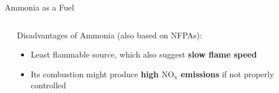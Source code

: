 \begin{frame}{Ammonia as a Fuel}
\begin{columns}[c, onlytextwidth]
\begin{column}{0.4\textwidth}
        \end{column}

        \begin{column}{0.6\textwidth}

            Disadvantages of Ammonia (also based on NFPAs\footnotemark[1]):

            \begin{itemize}
                \item Least flammable source, which also suggest \textbf{slow flame speed}
                \item Its combustion might produce \textbf{high $\mathrm{NO_x}$ emissions} if not properly controlled
            \end{itemize}

        \end{column}

    \end{columns}


\end{frame}